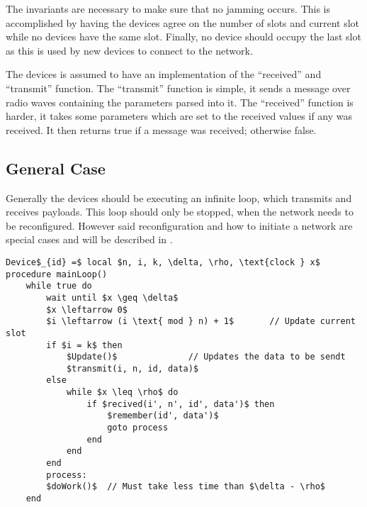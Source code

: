 The invariants are necessary to make sure that no jamming occurs. 
This is accomplished by having the devices agree on the number of slots and current slot while no devices have the same slot. 
Finally, no device should occupy the last slot as this is used by new devices to connect to the network.

The devices is assumed to have an implementation of the \enquote{received} and \enquote{transmit} function.
The \enquote{transmit} function is simple, it sends a message over radio waves containing the parameters parsed into it.
The \enquote{received} function is harder, it takes some parameters which are set to the received values if any was received. 
It then returns true if a message was received; otherwise false.
                    
\subsection{General Case} %
\label{sub:general_case}
Generally the devices should be executing an infinite loop, which transmits and receives payloads.
This loop should only be stopped, when the network needs to be reconfigured.
However said reconfiguration and how to initiate a network are special cases and will be described in .

\begin{lstlisting}[style=pseudocode,mathescape=true,caption={Pseudocode example of the main loop}] 
Device$_{id} =$ local $n, i, k, \delta, \rho, \text{clock } x$ 
procedure mainLoop()
	while true do
		wait until $x \geq \delta$
		$x \leftarrow 0$
		$i \leftarrow (i \text{ mod } n) + 1$		// Update current slot
		if $i = k$ then
			$Update()$				// Updates the data to be sendt
			$transmit(i, n, id, data)$
		else 
			while $x \leq \rho$ do
				if $recived(i', n', id', data')$ then
					$remember(id', data')$
					goto process
				end
			end
		end
		process:
		$doWork()$	// Must take less time than $\delta - \rho$	
	end
\end{lstlisting}  

            